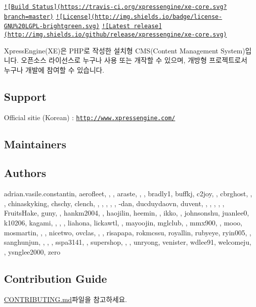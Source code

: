 \href{https://travis-ci.org/xpressengine/xe-core}{\tt !\mbox{[}Build Status\mbox{]}(https\+://travis-\/ci.\+org/xpressengine/xe-\/core.\+svg?branch=master)} \href{http://www.gnu.org/licenses/gpl.html}{\tt !\mbox{[}License\mbox{]}(http\+://img.\+shields.\+io/badge/license-\/\+G\+N\+U\%20\+L\+G\+P\+L-\/brightgreen.\+svg)} \href{https://github.com/xpressengine/xe-core/releases}{\tt !\mbox{[}Latest release\mbox{]}(http\+://img.\+shields.\+io/github/release/xpressengine/xe-\/core.\+svg)}

Xpress\+Engine(\+X\+E)은 P\+H\+P로 작성한 설치형 C\+M\+S(\+Content Management System)입니다. 오픈소스 라이선스로 누구나 사용 또는 개작할 수 있으며, 개방형 프로젝트로서 누구나 개발에 참여할 수 있습니다.

\subsection*{Support}


\begin{DoxyItemize}
\item Official sitie (Korean) \+: \href{http://www.xpressengine.com/}{\tt http\+://www.\+xpressengine.\+com/}
\end{DoxyItemize}

\subsection*{Maintainers}

\subsection*{Authors}

adrian.\+vasile.\+constantin, aerofleet, , , araste, , , bradly1, buffkj, c2joy, , cbrghost, , , chinaskyking, chschy, clench, , , , , , -\/dan, ducduydaovn, duvent, , , , , , Fruits\+Hake, guny, , hankm2004, , haojilin, heemin, , ikko, , johnsonshu, juanlee0, k10206, kagami, , , , liahona, lickawtl, , mayoojin, mglclub, , mmx900, , mooo, mosmartin, , , nicetwo, ovclas, , , risapapa, rokmcssu, royallin, rubyeye, ryin005, , sanghunjun, , , , sspa3141, , supershop, , , unryong, venister, wdlee91, welcomeju, , ysnglee2000, zero

\subsection*{Contribution Guide}

{\ttfamily \hyperlink{CONTRIBUTING_8md}{C\+O\+N\+T\+R\+I\+B\+U\+T\+I\+N\+G.\+md}}파일을 참고하세요.

